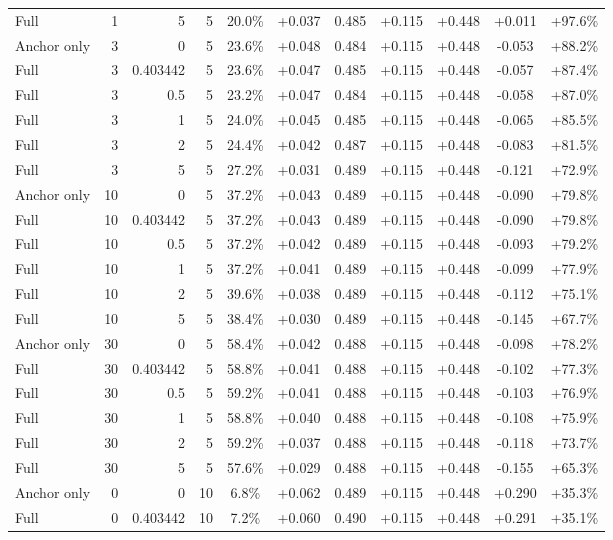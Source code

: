\begin{table}[htbp]
\begin{tabular}{lrrrccccccc}
Full & 1 & 5 & 5 & 20.0\% & +0.037 & 0.485 & +0.115 & +0.448 & +0.011 & +97.6\% \\
Anchor only & 3 & 0 & 5 & 23.6\% & +0.048 & 0.484 & +0.115 & +0.448 & -0.053 & +88.2\% \\
Full & 3 & 0.403442 & 5 & 23.6\% & +0.047 & 0.485 & +0.115 & +0.448 & -0.057 & +87.4\% \\
Full & 3 & 0.5 & 5 & 23.2\% & +0.047 & 0.484 & +0.115 & +0.448 & -0.058 & +87.0\% \\
Full & 3 & 1 & 5 & 24.0\% & +0.045 & 0.485 & +0.115 & +0.448 & -0.065 & +85.5\% \\
Full & 3 & 2 & 5 & 24.4\% & +0.042 & 0.487 & +0.115 & +0.448 & -0.083 & +81.5\% \\
Full & 3 & 5 & 5 & 27.2\% & +0.031 & 0.489 & +0.115 & +0.448 & -0.121 & +72.9\% \\
Anchor only & 10 & 0 & 5 & 37.2\% & +0.043 & 0.489 & +0.115 & +0.448 & -0.090 & +79.8\% \\
Full & 10 & 0.403442 & 5 & 37.2\% & +0.043 & 0.489 & +0.115 & +0.448 & -0.090 & +79.8\% \\
Full & 10 & 0.5 & 5 & 37.2\% & +0.042 & 0.489 & +0.115 & +0.448 & -0.093 & +79.2\% \\
Full & 10 & 1 & 5 & 37.2\% & +0.041 & 0.489 & +0.115 & +0.448 & -0.099 & +77.9\% \\
Full & 10 & 2 & 5 & 39.6\% & +0.038 & 0.489 & +0.115 & +0.448 & -0.112 & +75.1\% \\
Full & 10 & 5 & 5 & 38.4\% & +0.030 & 0.489 & +0.115 & +0.448 & -0.145 & +67.7\% \\
Anchor only & 30 & 0 & 5 & 58.4\% & +0.042 & 0.488 & +0.115 & +0.448 & -0.098 & +78.2\% \\
Full & 30 & 0.403442 & 5 & 58.8\% & +0.041 & 0.488 & +0.115 & +0.448 & -0.102 & +77.3\% \\
Full & 30 & 0.5 & 5 & 59.2\% & +0.041 & 0.488 & +0.115 & +0.448 & -0.103 & +76.9\% \\
Full & 30 & 1 & 5 & 58.8\% & +0.040 & 0.488 & +0.115 & +0.448 & -0.108 & +75.9\% \\
Full & 30 & 2 & 5 & 59.2\% & +0.037 & 0.488 & +0.115 & +0.448 & -0.118 & +73.7\% \\
Full & 30 & 5 & 5 & 57.6\% & +0.029 & 0.488 & +0.115 & +0.448 & -0.155 & +65.3\% \\
Anchor only & 0 & 0 & 10 & 6.8\% & +0.062 & 0.489 & +0.115 & +0.448 & +0.290 & +35.3\% \\
Full & 0 & 0.403442 & 10 & 7.2\% & +0.060 & 0.490 & +0.115 & +0.448 & +0.291 & +35.1\% \\

\end{tabular}
\end{table}
